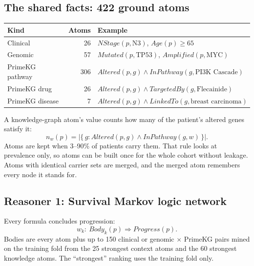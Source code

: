 \documentclass[11pt,a4paper]{article}
\newcommand{\pred}[1]{\mathit{#1}}
\begin{document}
\subsection{The shared facts: 422 ground atoms}
\begin{center}
\begin{tabular}{lrl}
\toprule
Kind & Atoms & Example \\
\midrule
Clinical & 26 & $\pred{NStage}(p,\mathrm{N3})$, $\pred{Age}(p)\ge65$ \\
Genomic & 57 & $\pred{Mutated}(p,\mathrm{TP53})$, $\pred{Amplified}(p,\mathrm{MYC})$ \\
PrimeKG pathway & 306 & $\pred{Altered}(p,g)\wedge\pred{InPathway}(g,\text{PI3K Cascade})$ \\
PrimeKG drug & 26 & $\pred{Altered}(p,g)\wedge\pred{TargetedBy}(g,\text{Flecainide})$ \\
PrimeKG disease & 7 & $\pred{Altered}(p,g)\wedge\pred{LinkedTo}(g,\text{breast carcinoma})$ \\
\bottomrule
\end{tabular}
\end{center}
A knowledge-graph atom's value counts how many of the patient's altered genes satisfy it:
\begin{equation}
n_w(p)=\big|\{\,g:\pred{Altered}(p,g)\wedge\pred{InPathway}(g,w)\,\}\big|.
\end{equation}
Atoms are kept when 3--90\% of patients carry them. That rule looks at prevalence only, so atoms can be built once for the whole cohort without leakage. Atoms with identical carrier sets are merged, and the merged atom remembers every node it stands for.

\subsection{Reasoner 1: Survival Markov logic network}
Every formula concludes progression:
\begin{equation}
w_k:\ \pred{Body}_k(p)\Rightarrow\pred{Progress}(p).
\end{equation}
Bodies are every atom plus up to 150 clinical or genomic $\times$ PrimeKG pairs mined on the training fold from the 25 strongest context atoms and the 60 strongest knowledge atoms. The ``strongest'' ranking uses the training fold only.
\end{document}
